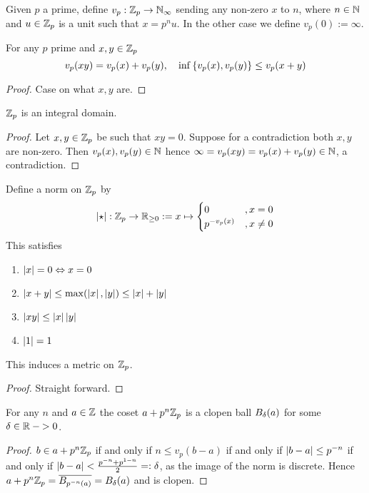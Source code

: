 \begin{dfn}
    Given $p$ a prime, define $v_p : \mathbb{Z}_p \to \mathbb{N}_\infty$
    sending any non-zero $x$ to $n$,
    where $n \in \mathbb{N}$
    and $u \in \mathbb{Z}_p$ is a unit such that $x = p^n u$.
    In the other case we define $v_p(0):=\infty$.
\end{dfn}

\begin{prop}
    For any $p$ prime and $x,y \in \mathbb{Z}_p$
    \[v_p(x y) = v_p(x) + v_p(y), \quad 
    \inf \left\{v_p(x), v_p(y)\right\} \le v_p(x + y)\]
\end{prop}
\begin{proof}
    Case on what $x,y$ are.
\end{proof}

\begin{cor}
    $\Z_p$ is an integral domain.
\end{cor}
\begin{proof}
    Let $x, y \in \mathbb{Z}_p$ be such that $xy = 0$.
    Suppose for a contradiction both $x, y$ are non-zero.
    Then $v_p(x), v_p(y) \in \mathbb{N}$ hence
    $\infty = v_p(x y) = v_p(x) + v_p(y) \in \mathbb{N}$, 
    a contradiction.
\end{proof}

\begin{dfn}[Metric on $\Z_p$]
    Define a norm on $\Z_p$ by 
    \[\left\vert \star \right\vert : \mathbb{Z}_p \to \mathbb{R}_{\ge 0} := x \mapsto 
    \begin{cases}
        0 &, x = 0\\
        p^{-v_p(x)} &, x \ne 0
    \end{cases}\]
    This satisfies 
    \begin{enumerate}
        \item $\left\vert x \right\vert = 0 \Leftrightarrow x = 0$
        \item $\left\vert x + y \right\vert \le \max(\left\vert x \right\vert,\left\vert y \right\vert) \le \left\vert x \right\vert + \left\vert y \right\vert$
        \item $\left\vert xy \right\vert \le \left\vert x \right\vert \left\vert y \right\vert$
        \item $\left\vert 1 \right\vert = 1$
    \end{enumerate}
    This induces a metric on $\Z_p$.
\end{dfn}
\begin{proof}
    Straight forward.
\end{proof}

\begin{prop}
    For any $n$ and $a \in \mathbb{Z}$
    the coset $a + p^n \mathbb{Z}_p$ is a clopen ball
    $B_{\delta} (a)$ for some $\delta \in \mathbb{R}-{>0}$.
\end{prop}
\begin{proof}
    $b \in a + p^n \mathbb{Z}_p$ if and only if 
    $n \le v_p(b - a)$ if and only if 
    $\left\vert b - a \right\vert \le p^{-n}$
    if and only if 
    $\left\vert b - a \right\vert < \frac{p^{-n}+p^{1-n}}{2} =: \delta$,
    as the image of the norm is discrete.
    Hence $a + p^n \mathbb{Z}_p = \overline{B_{p^{-n}(a)}} = B_\delta(a)$ and is clopen.
\end{proof}

